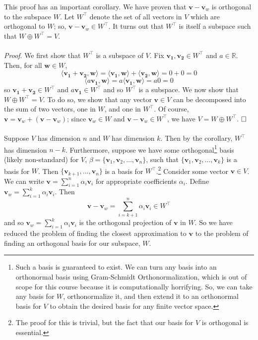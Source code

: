 \documentclass{article}
\newcommand{\R}{\mathbb{R}}
\newcommand{\la}{\langle}
\newcommand{\ra}{\rangle}
\newcommand{\tit}{\textit}
\begin{document}
This proof has an important corollary. We have proven that $\mathbf{v} - \mathbf{v}_w$ is orthogonal to the subspace $W$. Let $W^{\top}$ denote the set of all vectors in $V$ which are orthogonal to $W$; so, $\mathbf{v} - \mathbf{v}_w \in W^{\top}$. It turns out that $W^{\top}$ is itself a subspace such that $W \oplus W^{\top} = V$. \\\\
\tit{Proof}. We first show that $W^{\top}$ is a subspace of $V$. Fix $\mathbf{v_1}, \mathbf{v_2} \in W^{\top}$ and $a \in \R$. Then, for all $\mathbf{w} \in W$, $$\la \mathbf{v_1} + \mathbf{v_2}, \mathbf{w}\ra = \la \mathbf{v_1}, \mathbf{w}\ra + \la \mathbf{v_2}, \mathbf{w} \ra = 0 + 0 = 0$$ $$\la a\mathbf{v_1}, \mathbf{w} \ra = a\la \mathbf{v_1}, \mathbf{w} \ra = a0 = 0$$ so $\mathbf{v_1} + \mathbf{v_2} \in W^{\top}$ and $a\mathbf{v_1} \in W^{\top}$ and so $W^{\top}$ is a subspace. We now show that $W \oplus W^{\top} = V$. To do so, we show that any vector $\mathbf{v} \in V$ can be decomposed into the sum of two vectors, one in $W$, and one in $W^{\top}$. Of course, $\mathbf{v} = \mathbf{v}_w + (\mathbf{v} - \mathbf{v}_w)$; since $\mathbf{v}_w \in W$ and $\mathbf{v} - \mathbf{v}_w \in W^{\top}$, we have $V = W \oplus W^{\top}$. $\hfill\square$ \\\\
Suppose $V$ has dimension $n$ and $W$ has dimension $k$. Then by the corollary, $W^{\top}$ has dimension $n - k$. Furthermore, suppose we have some orthogonal\footnote{Such a basis is guaranteed to exist. We can turn any basis into an orthonormal basis using Gram-Schmidt Orthonormalization, which is out of scope for this course because it is computationally horrifying. So, we can take any basis for $W$, orthonormalize it, and then extend it to an orthonormal basis for $V$ to obtain the desired basis for any finite vector space.} basis (likely non-standard) for $V$, $\beta = \{\mathbf{v}_1, \mathbf{v}_2, \ldots, \mathbf{v}_n\}$, such that $\{\mathbf{v}_1, \mathbf{v}_2, \ldots, \mathbf{v}_k\}$ is a basis for $W$. Then $\{\mathbf{v}_{k+1}, \ldots, \mathbf{v}_n\}$ is a basis for $W^{\top}$.\footnote{The proof for this is trivial, but the fact that our basis for $V$ is orthogonal is essential.} Consider some vector $\mathbf{v} \in V$. We can write $\mathbf{v} = \sum\limits_{i = 1}^n \alpha_i\mathbf{v}_i$ for appropriate coefficients $\alpha_i$. Define $\mathbf{v}_w = \sum\limits_{i = 1}^k\alpha_i\mathbf{v}_i$. Then $$\mathbf{v} - \mathbf{v}_w = \sum\limits_{i = k+1}^n\alpha_i\mathbf{v}_i \in W^{\top}$$ and so $\mathbf{v}_w = \sum\limits_{i=1}^k\alpha_i\mathbf{v}_i$ is the orthogonal projection of $\mathbf{v}$ in $W$. So we have reduced the problem of finding the closest approximation to $\mathbf{v}$ to the problem of finding an orthogonal basis for our subspace, $W$.
\end{document}
